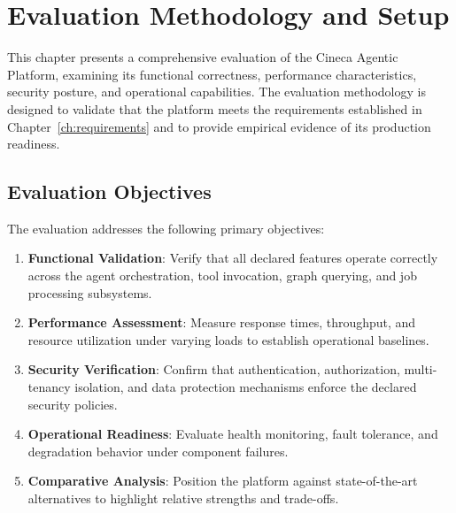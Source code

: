 
\section{Evaluation Methodology and Setup}
\label{sec:eval-methodology}

This chapter presents a comprehensive evaluation of the Cineca Agentic Platform, examining its functional correctness, performance characteristics, security posture, and operational capabilities. The evaluation methodology is designed to validate that the platform meets the requirements established in Chapter~\ref{ch:requirements} and to provide empirical evidence of its production readiness.

\subsection{Evaluation Objectives}

The evaluation addresses the following primary objectives:

\begin{enumerate}
    \item \textbf{Functional Validation}: Verify that all declared features operate correctly across the agent orchestration, tool invocation, graph querying, and job processing subsystems.
    
    \item \textbf{Performance Assessment}: Measure response times, throughput, and resource utilization under varying loads to establish operational baselines.
    
    \item \textbf{Security Verification}: Confirm that authentication, authorization, multi-tenancy isolation, and data protection mechanisms enforce the declared security policies.
    
    \item \textbf{Operational Readiness}: Evaluate health monitoring, fault tolerance, and degradation behavior under component failures.
    
    \item \textbf{Comparative Analysis}: Position the platform against state-of-the-art alternatives to highlight relative strengths and trade-offs.
\end{enumerate}

